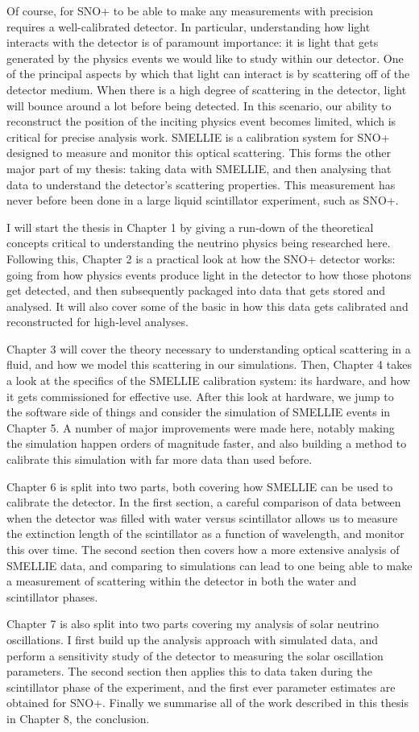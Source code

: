 Of course, for SNO+ to be able to make any measurements with precision requires a well-calibrated detector. In particular, understanding how light interacts with the detector is of paramount importance: it is light that gets generated by the physics events we would like to study within our detector. One of the principal aspects by which that light can interact is by scattering off of the detector medium. When there is a high degree of scattering in the detector, light will bounce around a lot before being detected. In this scenario, our ability to reconstruct the position of the inciting physics event becomes limited, which is critical for precise analysis work. SMELLIE is a calibration system for SNO+ designed to measure and monitor this optical scattering. This forms the other major part of my thesis: taking data with SMELLIE, and then analysing that data to understand the detector's scattering properties. This measurement has never before been done in a large liquid scintillator experiment, such as SNO+.

I will start the thesis in Chapter 1 by giving a run-down of the theoretical concepts critical to understanding the neutrino physics being researched here. Following this, Chapter 2 is a practical look at how the SNO+ detector works: going from how physics events produce light in the detector to how those photons get detected, and then subsequently packaged into data that gets stored and analysed. It will also cover some of the basic in how this data gets calibrated and reconstructed for high-level analyses.

Chapter 3 will cover the theory necessary to understanding optical scattering in a fluid, and how we model this scattering in our simulations. Then, Chapter 4 takes a look at the specifics of the SMELLIE calibration system: its hardware, and how it gets commissioned for effective use. After this look at hardware, we jump to the software side of things and consider the simulation of SMELLIE events in Chapter 5. A number of major improvements were made here, notably making the simulation happen orders of magnitude faster, and also building a method to calibrate this simulation with far more data than used before.

Chapter 6 is split into two parts, both covering how SMELLIE can be used to calibrate the detector. In the first section, a careful comparison of data between when the detector was filled with water versus scintillator allows us to measure the extinction length of the scintillator as a function of wavelength, and monitor this over time. The second section then covers how a more extensive analysis of SMELLIE data, and comparing to simulations can lead to one being able to make a measurement of scattering within the detector in both the water and scintillator phases.

Chapter 7 is also split into two parts covering my analysis of solar neutrino oscillations. I first build up the analysis approach with simulated data, and perform a sensitivity study of the detector to measuring the solar oscillation parameters. The second section then applies this to data taken during the scintillator phase of the experiment, and the first ever parameter estimates are obtained for SNO+. Finally we summarise all of the work described in this thesis in Chapter 8, the conclusion.